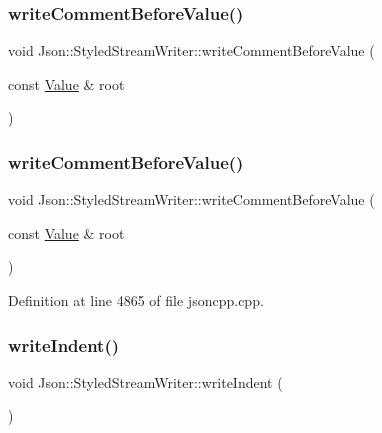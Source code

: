 \subsubsection{\texorpdfstring{write\+Comment\+Before\+Value()}{writeCommentBeforeValue()}\hspace{0.1cm}{\footnotesize\ttfamily [1/2]}}
{\footnotesize\ttfamily void Json\+::\+Styled\+Stream\+Writer\+::write\+Comment\+Before\+Value (\begin{DoxyParamCaption}\item[{const \hyperlink{class_json_1_1_value}{Value} \&}]{root }\end{DoxyParamCaption})\hspace{0.3cm}{\ttfamily [private]}}

\hypertarget{class_json_1_1_styled_stream_writer_a79c3c2b320475035c47b2db484a3e434}{}\label{class_json_1_1_styled_stream_writer_a79c3c2b320475035c47b2db484a3e434} 
\subsubsection{\texorpdfstring{write\+Comment\+Before\+Value()}{writeCommentBeforeValue()}\hspace{0.1cm}{\footnotesize\ttfamily [2/2]}}
{\footnotesize\ttfamily void Json\+::\+Styled\+Stream\+Writer\+::write\+Comment\+Before\+Value (\begin{DoxyParamCaption}\item[{const \hyperlink{class_json_1_1_value}{Value} \&}]{root }\end{DoxyParamCaption})\hspace{0.3cm}{\ttfamily [private]}}



Definition at line 4865 of file jsoncpp.\+cpp.

\hypertarget{class_json_1_1_styled_stream_writer_a5a52fa5b406f1580a61dde3b5638e76d}{}\label{class_json_1_1_styled_stream_writer_a5a52fa5b406f1580a61dde3b5638e76d} 
\subsubsection{\texorpdfstring{write\+Indent()}{writeIndent()}\hspace{0.1cm}{\footnotesize\ttfamily [1/2]}}
{\footnotesize\ttfamily void Json\+::\+Styled\+Stream\+Writer\+::write\+Indent (\begin{DoxyParamCaption}{ }\end{DoxyParamCaption})\hspace{0.3cm}{\ttfamily [private]}}

